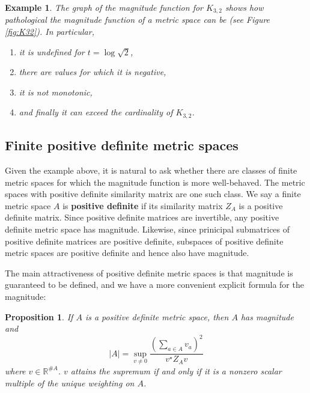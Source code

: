 \documentclass[11pt]{article}
\theoremstyle{mythm}
\newtheorem{ex}[defn]{Example}
\newtheorem{prop}[defn]{Proposition}
\begin{document}
\begin{ex}
The graph of the magnitude function for $K_{3,2}$ shows how pathological the magnitude function of a metric space can be (see Figure \ref{fig:K32}). In particular,
\begin{enumerate}[label=\arabic*.]
\item it is undefined for $t = \log{\sqrt{2}}$,
\item there are values for which it is negative,
\item it is not monotonic,
\item and finally it can exceed the cardinality of $K_{3,2}$.
\end{enumerate}
\end{ex}

\subsection{Finite positive definite metric spaces}

Given the example above, it is natural to ask whether there are classes of finite metric spaces for which the magnitude function is more well-behaved. The metric spaces with positive definite similarity matrix are one such class. We say a finite metric space $A$ is \textbf{positive definite} if its similarity matrix $Z_A$ is a positive definite matrix. Since positive definite matrices are invertible, any positive definite metric space has magnitude. Likewise, since prinicipal submatrices of positive definite matrices are positive definite, subspaces of positive definite metric spaces are positive definite and hence also have magnitude.

The main attractiveness of positive definite metric spaces is that magnitude is guaranteed to be defined, and we have a more convenient explicit formula for the magnitude:

\begin{prop}\label{prop:finiteposdefsup}
If $A$ is a positive definite metric space, then $A$ has magnitude and
\begin{equation*}
\vert A \vert = \sup\limits_{v \neq 0}\frac{\left(\sum_{a\in A}v_a\right)^2}{v^\star Z_Av}
\end{equation*}
where $v \in \mathbb{R}^{\#A}$. $v$ attains the supremum if and only if it is a nonzero scalar multiple of the unique weighting on $A$.
\end{prop}
\end{document}
